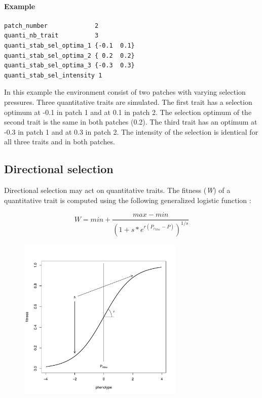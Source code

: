\documentclass[letterpaper,12pt,oneside]{book}
\begin{document}
\paragraph{Example}\hspace*{\fill}
\begin{lstlisting}[frame=single]
patch_number             2
quanti_nb_trait          3
quanti_stab_sel_optima_1 {-0.1  0.1}							
quanti_stab_sel_optima_2 { 0.2  0.2}
quanti_stab_sel_optima_3 {-0.3  0.3}	
quanti_stab_sel_intensity 1													
\end{lstlisting}
In this example the environment consist of two patches with varying selection pressures. Three quantitative traits are simulated. The first trait has a selection optimum at -0.1 in patch 1 and at 0.1 in patch 2. The selection optimum of the second trait is the same in both patches (0.2). The third trait has an optimum at -0.3 in patch 1 and at 0.3 in patch 2. The intensity of the selection is identical for all three traits and in both patches.    

\subsection{Directional selection}
Directional selection may act on quantitative traits. The fitness (\textit{W}) of a quantitative trait is computed using the following generalized logistic function \citep{Richards_1959}: 

		\[ W = min + \frac{max-min}{(1+s*e^{r(P_{r_{Max}}-P)})^{1/s}} \] 

\begin{figure}[h]
	\centering
		\includegraphics[width=0.70\textwidth]{directional-selection.pdf}
	\label{fig:directional-selection}
\end{figure}
\end{document}
